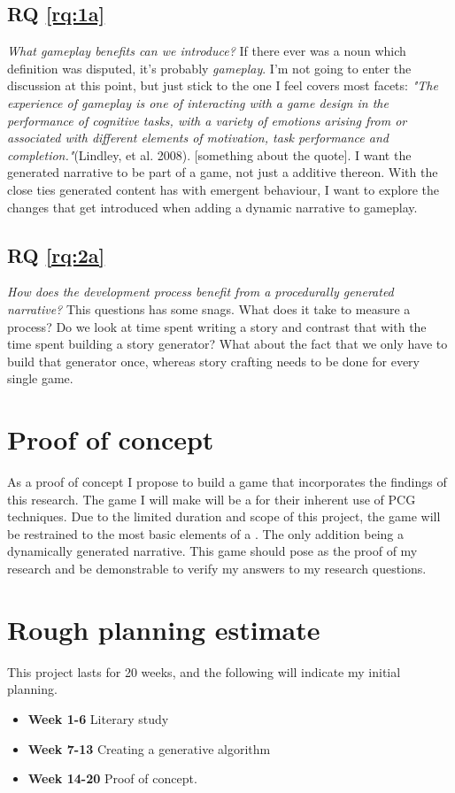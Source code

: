 \subsection{RQ \ref{rq:1a}}
\textit{What gameplay benefits can we introduce?}
If there ever was a noun which definition was disputed, it's probably \textit{gameplay}. I'm not going to enter the discussion at this point, but just stick to the one I feel covers most facets: \textit{"The experience of gameplay is one of interacting with a game design in the performance of cognitive tasks, with a variety of emotions arising from or associated with different elements of motivation, task performance and completion."}(Lindley, et al. 2008). [something about the quote].
I want the generated narrative to be part of a game, not just a additive thereon. With the close ties generated content has with emergent behaviour, I want to explore the changes that get introduced when adding a dynamic narrative to gameplay.

\subsection{RQ \ref{rq:2a}}
\textit{How does the development process benefit from a procedurally generated narrative?} This questions has some snags. What does it take to measure a process? Do we look at time spent writing a story and contrast that with the time spent building a story generator? What about the fact that we only have to build that generator once, whereas story crafting needs to be done for every single game.

\section{Proof of concept}
As a proof of concept I propose to build a game that incorporates the findings of this research. The game I will make will be a \rogue for their inherent use of PCG techniques. Due to the limited duration and scope of this project, the game will be restrained to the most basic elements of a \rogue. The only addition being a dynamically generated narrative. This game should pose as the proof of my research and be demonstrable to verify my answers to my research questions.

\section{Rough planning estimate}
This project lasts for 20 weeks, and the following will indicate my initial planning.

\begin{itemize}
	\item \textbf{Week 1-6} Literary study
	\item \textbf{Week 7-13} Creating a generative algorithm
	\item \textbf{Week 14-20} Proof of concept. 
\end{itemize}